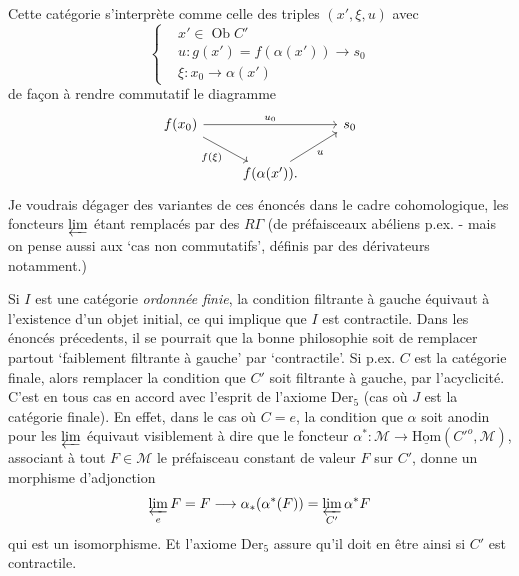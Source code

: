 
Cette catégorie s'interprète comme celle des triples $(x', \xi, u)$ avec
\[
\left\{
\begin{aligned}
& x' \in \operatorname{Ob} C' \\
& u : g(x') = f(\alpha(x')) \longrightarrow s_0 \\
& \xi : x_0 \longrightarrow \alpha(x')
\end{aligned}
\right.
\]
 de façon à rendre commutatif le diagramme
\[
\begin{tikzcd}
f(x_0) \arrow[rr, "u_0"] \arrow[dr, "f(\xi)"'] & & s_0 \\
 & f(\alpha(x')). \arrow[ur, "u"'] &
\end{tikzcd}
\]
Je voudrais dégager des variantes de ces énoncés dans le cadre cohomologique, les foncteurs $\varprojlim$ étant remplacés par des $R\Gamma$ (de préfaisceaux abéliens p.ex. - mais on pense aussi aux `cas non commutatifs', définis par des dérivateurs notamment.)

\clearpage


Si $I$ est une catégorie \textit{ordonnée finie}, la condition filtrante à gauche équivaut à l'existence d'un objet initial, ce qui implique que $I$ est contractile. Dans les énoncés précedents, il se pourrait que la bonne philosophie soit de remplacer partout `faiblement filtrante à gauche' par `contractile'. Si p.ex. $C$ est la catégorie finale, alors remplacer la condition que $C'$ soit filtrante à gauche, par l'acyclicité. C'est en tous cas en accord avec l'esprit de l'axiome $\mathrm{Der}_5$ (cas où $J$ est la catégorie finale). En effet, dans le cas où $C = e$, la condition que $\alpha$ soit anodin pour les $\varprojlim$ équivaut visiblement à dire que le foncteur $\alpha^* : \mathcal{M} \longrightarrow \underline{\mathrm{Hom}}(C'^{o}, \mathcal{M})$, associant à tout $F \in \mathcal{M}$ le préfaisceau constant de valeur $F$ %
sur $C'$, donne un morphisme d'adjonction
\[ \varprojlim_{e} F = F \longrightarrow \alpha_*(\alpha^*(F)) = \varprojlim_{C'} \alpha^* F \]
qui est un isomorphisme. Et l'axiome $\mathrm{Der}_5$ assure qu'il doit en être ainsi si $C'$ est contractile.

